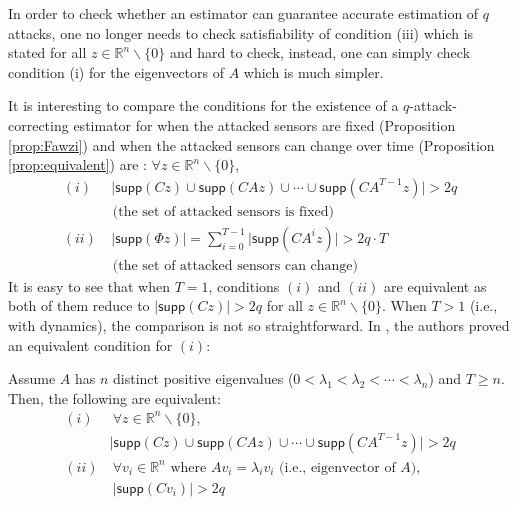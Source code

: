 \documentclass[../../thesis.tex]{subfiles}
\begin{document}
In order to check whether an estimator can guarantee accurate estimation of $q$ attacks, one no longer needs to check satisfiability of condition (iii) which is stated for all $z \in \mathbb{R}^n\backslash \{0 \}$ and hard to check, instead, one can simply check condition (i) for the eigenvectors of $A$ which is much simpler.

It is interesting to compare the conditions for the existence of a $q$-attack-correcting estimator for when the attacked sensors are fixed (Proposition \ref{prop:Fawzi}) and when the attacked sensors can change over time (Proposition \ref{prop:equivalent}) are :
$\forall z \in \mathbb{R}^n\backslash \{0 \}$,
\begin{equation}
\begin{aligned}
(i) &~  \lvert \textsf{supp}(Cz) \cup \textsf{supp}(CAz) \cup \cdots \cup \textsf{supp}(CA^{T-1} z) \rvert > 2q  \\& \text{ (the set of attacked sensors is fixed)}\\
(ii) & ~ \lvert \textsf{supp} (\Phi z) \rvert 
     =  \sum_{i=0}^{T-1} \lvert \textsf{supp} (C A^i z) \rvert > 2 q \cdot T \\& \text{ (the set of attacked sensors can change)} 
	\label{eq:connection}
\end{aligned}
\end{equation}
It is easy to see that when $T=1$, conditions $(i)$ and $(ii)$ are equivalent as both of them reduce to $\lvert \textsf{supp} (Cz) \rvert > 2q$ for all $z \in \mathbb{R}^n\backslash \{0 \}$.
When $T>1$ (i.e., with dynamics), the comparison is not so straightforward. In \cite{Fawzi:2014}, the authors proved an equivalent condition for $(i)$:

\begin{lem} \label{lem:distinct}
Assume $A$ has $n$ distinct positive eigenvalues ($0<\lambda_1 < \lambda_2 <\cdots < \lambda_n$) and $T \geq n$. Then, the following are equivalent:
\begin{equation}
\begin{aligned}
 (i) &~ \forall z \in \mathbb{R}^n \backslash \{0\},  \\& \lvert \textsf{supp}(Cz) \cup \textsf{supp}(CAz) \cup \cdots \cup \textsf{supp}(CA^{T-1} z) \rvert > 2q  \\
 (ii)  &~\forall v_i \in \mathbb{R}^n \text{ where }   Av_i = \lambda_i v_i \text{ (i.e., eigenvector of $A$)},\\& ~ \lvert \textsf{supp}(Cv_i) \rvert > 2q \nonumber
\label{eq:condition}
\end{aligned}
\end{equation}
\end{lem}
\end{document}
